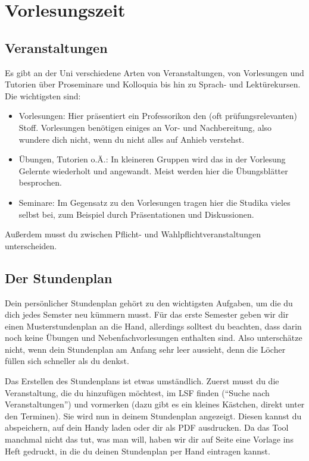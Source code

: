 \chapter{Vorlesungszeit}

\section{Veranstaltungen}

Es gibt an der Uni verschiedene Arten von Veranstaltungen, von Vorlesungen und Tutorien über Proseminare und Kolloquia bis hin zu  Sprach- und Lektürekursen. Die wichtigsten sind:

\begin{itemize}
	\item Vorlesungen: Hier präsentiert ein Professorikon den (oft prüfungsrelevanten) Stoff. Vorlesungen benötigen einiges an Vor- und Nachbereitung, also wundere dich nicht, wenn du nicht alles auf Anhieb verstehst.
	\item Übungen, Tutorien o.Ä.: In kleineren Gruppen wird das in der Vorlesung Gelernte wiederholt und angewandt. Meist werden hier die Übungsblätter besprochen.
	\item Seminare: Im Gegensatz zu den Vorlesungen tragen hier die Studika vieles selbst bei, zum Beispiel durch Präsentationen und Diskussionen.
\end{itemize}

Außerdem musst du zwischen Pflicht- und Wahlpflichtveranstaltungen unterscheiden.

\section{Der Stundenplan}

Dein persönlicher Stundenplan gehört zu den wichtigsten Aufgaben, um die du dich jedes Semster neu kümmern musst. Für das erste Semester geben wir dir einen Musterstundenplan an die Hand, allerdings solltest du beachten, dass darin noch keine Übungen und Nebenfachvorlesungen enthalten sind. Also unterschätze nicht, wenn dein Stundenplan am Anfang sehr leer aussieht, denn die Löcher füllen sich schneller als du denkst.

Das Erstellen des Stundenplans ist etwas umständlich. Zuerst musst du die Veranstaltung, die du hinzufügen möchtest, im LSF finden (``Suche nach Veranstaltungen'') und vormerken (dazu gibt es ein kleines Kästchen, direkt unter den Terminen). Sie wird nun in deinem Stundenplan angezeigt. Diesen kannst du abspeichern, auf dein Handy laden oder dir als PDF ausdrucken. Da das Tool manchmal nicht das tut, was man will, haben wir dir auf Seite \pageref{studenplan} eine Vorlage ins Heft gedruckt, in die du deinen Stundenplan per Hand eintragen kannst.

